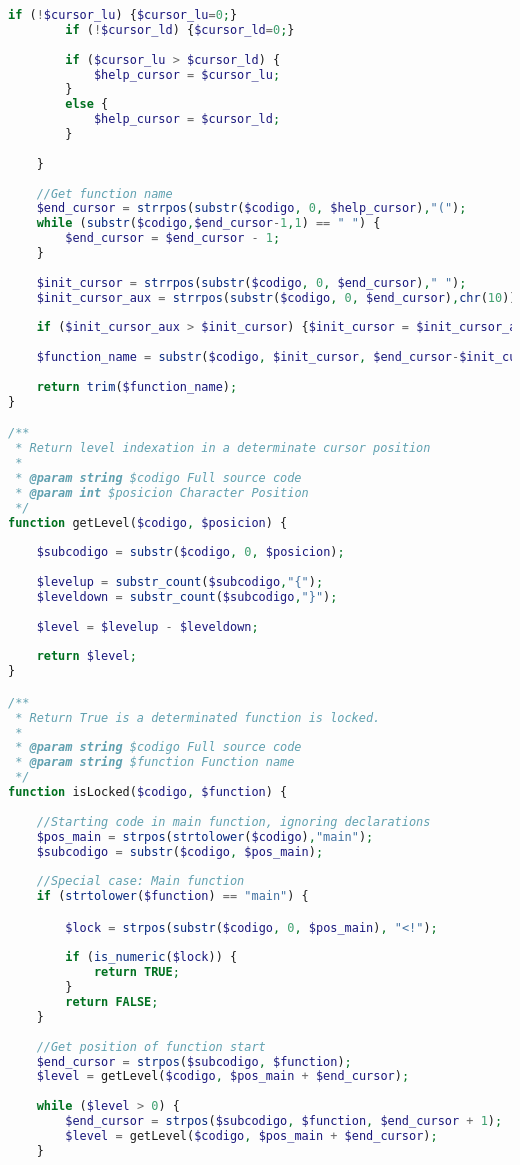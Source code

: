 \begin{lstlisting}[language=PHP]
		if (!$cursor_lu) {$cursor_lu=0;}
		if (!$cursor_ld) {$cursor_ld=0;}
		
		if ($cursor_lu > $cursor_ld) {
			$help_cursor = $cursor_lu;
		}
		else {
			$help_cursor = $cursor_ld;
		}
		
	}
	
	//Get function name
	$end_cursor = strrpos(substr($codigo, 0, $help_cursor),"(");
	while (substr($codigo,$end_cursor-1,1) == " ") {
		$end_cursor = $end_cursor - 1;
	}
	
	$init_cursor = strrpos(substr($codigo, 0, $end_cursor)," ");
	$init_cursor_aux = strrpos(substr($codigo, 0, $end_cursor),chr(10));
	
	if ($init_cursor_aux > $init_cursor) {$init_cursor = $init_cursor_aux;} // When main declaration have not object type
	
	$function_name = substr($codigo, $init_cursor, $end_cursor-$init_cursor);
	
	return trim($function_name);	
}

/**
 * Return level indexation in a determinate cursor position
 *
 * @param string $codigo Full source code
 * @param int $posicion Character Position
 */
function getLevel($codigo, $posicion) {
		
	$subcodigo = substr($codigo, 0, $posicion);
	
	$levelup = substr_count($subcodigo,"{");
	$leveldown = substr_count($subcodigo,"}");
	
	$level = $levelup - $leveldown;
	
	return $level;
}

/**
 * Return True is a determinated function is locked.
 * 
 * @param string $codigo Full source code
 * @param string $function Function name
 */
function isLocked($codigo, $function) {
	
	//Starting code in main function, ignoring declarations
	$pos_main = strpos(strtolower($codigo),"main");
	$subcodigo = substr($codigo, $pos_main);
	
	//Special case: Main function
	if (strtolower($function) == "main") {

		$lock = strpos(substr($codigo, 0, $pos_main), "<!");
		
		if (is_numeric($lock)) {
			return TRUE;
		}
		return FALSE;
	}
	
	//Get position of function start
	$end_cursor = strpos($subcodigo, $function);
	$level = getLevel($codigo, $pos_main + $end_cursor);
	
	while ($level > 0) {
		$end_cursor = strpos($subcodigo, $function, $end_cursor + 1);
		$level = getLevel($codigo, $pos_main + $end_cursor);
	}
	

\end{lstlisting}

